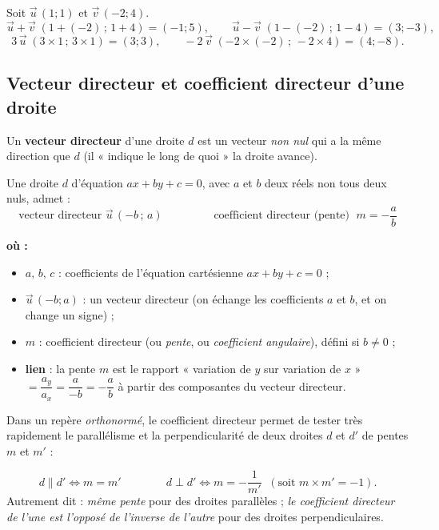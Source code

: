 \documentclass[11pt,a4paper]{article}
\newenvironment{ou}{%
  \par\smallskip\noindent\textbf{où :}\nopagebreak
  \begin{itemize}[leftmargin=1.8em,topsep=2pt,itemsep=1.5pt,parsep=0pt]}%
  {\end{itemize}}
\begin{document}
\begin{exemple}
Soit $\vec{u}\,(1;1)$ et $\vec{v}\,(-2;4)$.
\[
  \vec{u}+\vec{v}\;(1+(-2)\,;\,1+4)=(-1;5),\qquad
  \vec{u}-\vec{v}\;(1-(-2)\,;\,1-4)=(3;-3),
\]
\[
  3\,\vec{u}\;(3\times 1\,;\,3\times 1)=(3;3),\qquad
  -2\,\vec{v}\;(-2\times(-2)\,;\,-2\times 4)=(4;-8).
\]
\end{exemple}

\subsection{Vecteur directeur et coefficient directeur d'une droite}

\begin{definition}
Un \textbf{vecteur directeur} d'une droite $d$ est un vecteur \emph{non nul} qui a la même direction que
$d$ (il « indique le long de quoi » la droite avance).
\end{definition}

\begin{formule}[vecteur directeur et pente d'une droite d'équation $ax+by+c=0$]
Une droite $d$ d'équation $ax+by+c=0$, avec $a$ et $b$ deux réels non tous deux nuls, admet :
\[
  \boxed{\;\text{vecteur directeur }\vec{u}\,(-b\,;\,a)\;}\qquad\qquad
  \boxed{\;\text{coefficient directeur (pente) }\;m=-\dfrac{a}{b}\;}
\]
\begin{ou}
  \item $a,\,b,\,c$ : coefficients de l'équation cartésienne $ax+by+c=0$ ;
  \item $\vec{u}\,(-b;a)$ : un vecteur directeur (on échange les coefficients $a$ et $b$, et on change un signe) ;
  \item $m$ : coefficient directeur (ou \emph{pente}, ou \emph{coefficient angulaire}), défini si $b\neq 0$ ;
  \item \textbf{lien} : la pente $m$ est le rapport « variation de $y$ sur variation de $x$ »
        $=\dfrac{a_y}{a_x}=\dfrac{a}{-b}=-\dfrac{a}{b}$ à partir des composantes du vecteur directeur.
\end{ou}
\end{formule}

Dans un repère \emph{orthonormé}, le coefficient directeur permet de tester très rapidement le
parallélisme et la perpendicularité de deux droites $d$ et $d'$ de pentes $m$ et $m'$ :

\begin{theoreme}
\[
  d\parallel d' \iff m=m' \qquad\qquad
  d\perp d' \iff m=-\dfrac{1}{m'} \;\;(\text{soit } m\times m'=-1).
\]
Autrement dit : \emph{même pente} pour des droites parallèles ; \emph{le coefficient directeur de
l'une est l'opposé de l'inverse de l'autre} pour des droites perpendiculaires.
\end{theoreme}
\end{document}
